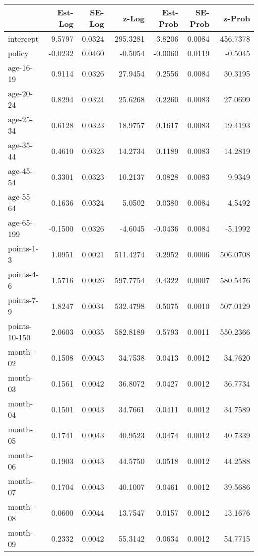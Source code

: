 \documentclass[10pt]{article}
\begin{document}
\begin{table}[ht]
\centering
\begin{tabular}{lrrrrrr}
  \hline
 & Est-Log & SE-Log & z-Log & Est-Prob & SE-Prob & z-Prob \\ 
  \hline
intercept & -9.5797 & 0.0324 & -295.3281 & -3.8206 & 0.0084 & -456.7378 \\ 
  policy & -0.0232 & 0.0460 & -0.5054 & -0.0060 & 0.0119 & -0.5045 \\ 
  age-16-19 & 0.9114 & 0.0326 & 27.9454 & 0.2556 & 0.0084 & 30.3195 \\ 
  age-20-24 & 0.8294 & 0.0324 & 25.6268 & 0.2260 & 0.0083 & 27.0699 \\ 
  age-25-34 & 0.6128 & 0.0323 & 18.9757 & 0.1617 & 0.0083 & 19.4193 \\ 
  age-35-44 & 0.4610 & 0.0323 & 14.2734 & 0.1189 & 0.0083 & 14.2819 \\ 
  age-45-54 & 0.3301 & 0.0323 & 10.2137 & 0.0828 & 0.0083 & 9.9349 \\ 
  age-55-64 & 0.1636 & 0.0324 & 5.0502 & 0.0380 & 0.0084 & 4.5492 \\ 
  age-65-199 & -0.1500 & 0.0326 & -4.6045 & -0.0436 & 0.0084 & -5.1992 \\ 
  points-1-3 & 1.0951 & 0.0021 & 511.4274 & 0.2952 & 0.0006 & 506.0708 \\ 
  points-4-6 & 1.5716 & 0.0026 & 597.7754 & 0.4322 & 0.0007 & 580.5476 \\ 
  points-7-9 & 1.8247 & 0.0034 & 532.4798 & 0.5075 & 0.0010 & 507.0129 \\ 
  points-10-150 & 2.0603 & 0.0035 & 582.8189 & 0.5793 & 0.0011 & 550.2366 \\ 
  month-02 & 0.1508 & 0.0043 & 34.7538 & 0.0413 & 0.0012 & 34.7620 \\ 
  month-03 & 0.1561 & 0.0042 & 36.8072 & 0.0427 & 0.0012 & 36.7734 \\ 
  month-04 & 0.1501 & 0.0043 & 34.7661 & 0.0411 & 0.0012 & 34.7589 \\ 
  month-05 & 0.1741 & 0.0043 & 40.9523 & 0.0474 & 0.0012 & 40.7339 \\ 
  month-06 & 0.1903 & 0.0043 & 44.5750 & 0.0518 & 0.0012 & 44.2588 \\ 
  month-07 & 0.1704 & 0.0043 & 40.1007 & 0.0461 & 0.0012 & 39.5686 \\ 
  month-08 & 0.0600 & 0.0044 & 13.7547 & 0.0157 & 0.0012 & 13.1676 \\ 
  month-09 & 0.2332 & 0.0042 & 55.3142 & 0.0634 & 0.0012 & 54.7715 \\ 

\end{tabular}
\end{table}
\end{document}
